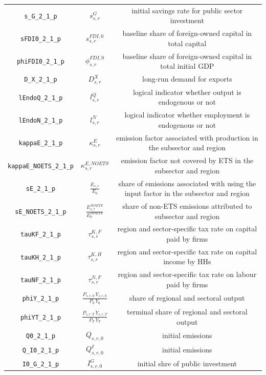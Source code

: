 \begin{center}
\begin{longtable}{ccc}
\texttt{s\_G\_2\_1\_p} & ${s^{G}_{s,r}}$ & initial savings rate for public sector investment\\
\texttt{sFDI0\_2\_1\_p} & ${s^{FDI,0}_{s,r}}$ & baseline share of foreign-owned capital in total capital\\
\texttt{phiFDI0\_2\_1\_p} & ${\phi^{FDI,0}_{s,r}}$ & baseline share of foreign-owned capital in total initial GDP\\
\texttt{D\_X\_2\_1\_p} & ${D^{X}_{s,r}}$ & long-run demand for exports\\
\texttt{lEndoQ\_2\_1\_p} & ${l^{Q}_{s,r}}$ & logical indicator whether output is endogenous or not\\
\texttt{lEndoN\_2\_1\_p} & ${l^{N}_{s,r}}$ & logical indicator whether employment is endogenous or not\\
\texttt{kappaE\_2\_1\_p} & ${\kappa^{E}_{s,r}}$ & emission factor associated with production in the subsector and region\\
\texttt{kappaE\_NOETS\_2\_1\_p} & ${\kappa^{E,NOETS}_{s,r}}$ & emission factor not covered by ETS in the subsector and region\\
\texttt{sE\_2\_1\_p} & ${\frac{E_{s,r}}{E_0}}$ & share of emissions associated with using the input factor in the subsector and region\\
\texttt{sE\_NOETS\_2\_1\_p} & ${\frac{E^{NOETS}_{s,r}}{E^{NOETS}_0}}$ & share of non-ETS emissions attributed to subsector and region\\
\texttt{tauKF\_2\_1\_p} & ${\tau^{K,F}_{s,r}}$ & region and sector-specific tax rate on capital paid by firms\\
\texttt{tauKH\_2\_1\_p} & ${\tau^{K,H}_{s,r}}$ & region and sector-specific tax rate on capital income by HHs\\
\texttt{tauNF\_2\_1\_p} & ${\tau^{N,F}_{s,r}}$ & region and sector-specific tax rate on labour paid by firms\\
\texttt{phiY\_2\_1\_p} & $\frac{P_{s,r,0} \, Y_{s,r,0}}{P_{0} \, Y_{0}}$ & share of regional and sectoral output\\
\texttt{phiYT\_2\_1\_p} & $\frac{P_{s,r,T} \, Y_{s,r,T}}{P_{T} \, Y_{T}}$ & terminal share of regional and sectoral output\\
\texttt{Q0\_2\_1\_p} & ${Q_{s,r,0}}$ & initial emissions\\
\texttt{Q\_I0\_2\_1\_p} & ${Q^I_{s,r,0}}$ & initial emissions\\
\texttt{I0\_G\_2\_1\_p} & ${I^G_{s,r,0}}$ & initial shre of public investment\\

\end{longtable}
\end{center}
